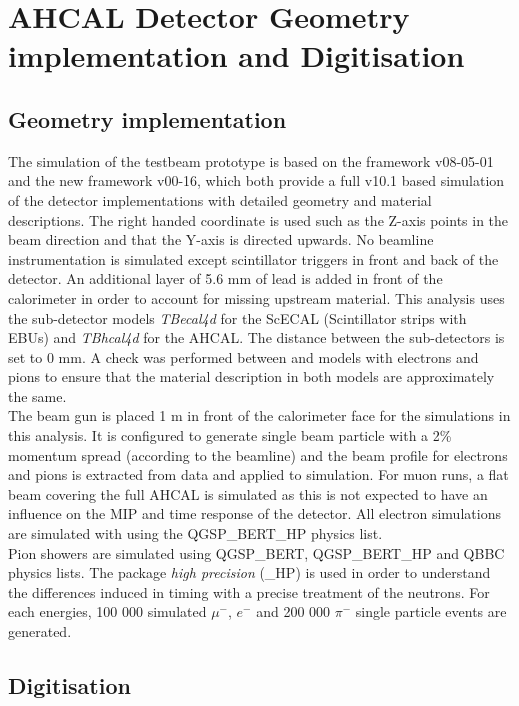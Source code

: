 \section{AHCAL Detector Geometry implementation and Digitisation}

\subsection{Geometry implementation}

The simulation of the testbeam prototype is based on the \mokka framework v08-05-01 and the new \ddhep framework v00-16, which both provide a full \geant v10.1 based simulation of the detector implementations with detailed geometry and material descriptions. The right handed coordinate is used such as the Z-axis points in the beam direction and that the Y-axis is directed upwards. No beamline instrumentation is simulated except scintillator triggers in front and back of the detector. An additional layer of 5.6 mm of lead is added in front of the calorimeter in order to account for missing upstream material. This analysis uses the sub-detector \mokka models \textit{TBecal4d} for the ScECAL (Scintillator strips with EBUs) and \textit{TBhcal4d} for the AHCAL. The distance between the sub-detectors is set to 0 mm. A check was performed between \mokka and \ddhep models with electrons and pions to ensure that the material description in both models are approximately the same.\\

The beam gun is placed 1 m in front of the calorimeter face for the simulations in this analysis. It is configured to generate single beam particle with a 2\% momentum spread (according to the beamline) and the beam profile for electrons and pions is extracted from data and applied to simulation. For muon runs, a flat beam covering the full AHCAL is simulated as this is not expected to have an influence on the MIP and time response of the detector. All electron simulations are simulated with  using the QGSP\_BERT\_HP physics list.\\

Pion showers are simulated using QGSP\_BERT, QGSP\_BERT\_HP and QBBC physics lists. The package \textit{high precision} (\_HP) is used in order to understand the differences induced in timing with a precise treatment of the neutrons. For each energies, 100 000 simulated $\mu^-$, $e^-$ and 200 000 $\pi^-$ single particle events are generated.

\subsection{Digitisation}

